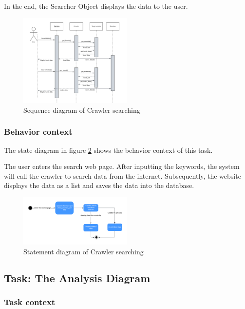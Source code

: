 \documentclass[conference]{IEEEtran}
\begin{document}
In the end, the Searcher Object displays the data to the user.
\begin{figure}[htbp]
	\centerline{\includegraphics[width=0.5\textwidth]{image/crawler searching sequence1.pdf}}
	\caption{Sequence diagram of Crawler searching }
	\label{crawlersequence1}
\end{figure}
\subsubsection{\textbf{Behavior context }}
\textbf{}

The state diagram in figure \ref{crawlerstatement1} shows the behavior context of this task. 

The user enters the search web page.  After inputting the keywords, the system will call the crawler to search data from the internet. Subsequently, the website displays the data as a list and saves the data into the database.

\begin{figure}[htbp]
	\centerline{\includegraphics[width=0.5\textwidth]{image/crawler searching statement1.pdf}}
	\caption{Statement diagram of Crawler searching }
	\label{crawlerstatement1}
\end{figure}



\subsection{\textbf{Task: The Analysis Diagram}}


\subsubsection{\textbf{Task context }}
\end{document}

